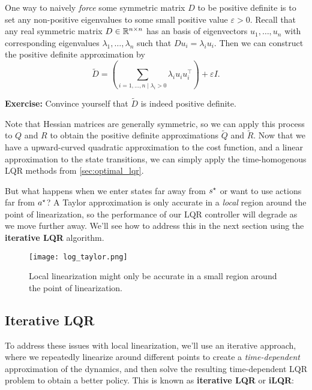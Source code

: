 \documentclass[\main/main]{subfiles}
\begin{document}
One way to naively \emph{force} some symmetric matrix $D$ to be positive definite is to set any non-positive eigenvalues to some small positive value $\varepsilon > 0$.
Recall that any real symmetric matrix $D \in \mathbb{R}^{n \times n}$ has an basis of eigenvectors $u_1, \dots, u_n$ with corresponding eigenvalues $\lambda_1, \dots, \lambda_n$ such that $D u_i = \lambda_i u_i$. Then we can construct the positive definite approximation by \[
    \widetilde{D} = \left( \sum_{i=1, \dots, n \mid \lambda_i > 0} \lambda_i u_i u_i^\top \right) + \varepsilon I.
\]

\textbf{Exercise:} Convince yourself that $\widetilde{D}$ is indeed positive definite.

Note that Hessian matrices are generally symmetric, so we can apply this process to $Q$ and $R$ to obtain the positive definite approximations $\widetilde{Q}$ and $\widetilde{R}$. Now that we have a upward-curved quadratic approximation to the cost function, and a linear approximation to the state transitions, we can simply apply the time-homogenous LQR methods from \autoref{sec:optimal_lqr}.


But what happens when we enter states far away from $s^\star$ or want to use actions far from $a^\star$?
A Taylor approximation is only accurate in a \emph{local} region around the point of linearization,
so the performance of our LQR controller will degrade as we move further away.
We'll see how to address this in the next section using the \textbf{iterative LQR} algorithm.
\begin{figure}[h]
    \centering
    \texttt{[image: log\_taylor.png]}
    \caption{Local linearization might only be accurate in a small region around the point of linearization.}
    \label{fig:local_linearization}
\end{figure}

\subsection{Iterative LQR}

To address these issues with local linearization, we'll use an iterative approach, where we repeatedly linearize around different points to create a \emph{time-dependent} approximation of the dynamics, and then solve the resulting time-dependent LQR problem to obtain a better policy.
This is known as \textbf{iterative LQR} or \textbf{iLQR}:
\end{document}
